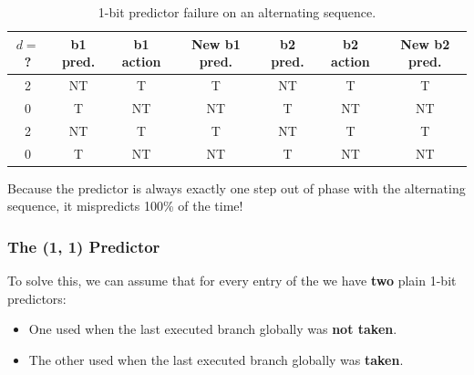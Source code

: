 \begin{table}[htpb]
    \centering
    \renewcommand{\arraystretch}{1.2}
    \begin{tabular}{c c c c | c c c}
        \textbf{\(d=\)?} & \textbf{b1 pred.} & \textbf{b1 action} & \textbf{New b1 pred.} & \textbf{b2 pred.} & \textbf{b2 action} & \textbf{New b2 pred.} \\
        \hline
        2 & NT & T  & T  & NT & T  & T \\
        0 & T  & NT & NT & T  & NT & NT \\
        2 & NT & T  & T  & NT & T  & T \\
        0 & T  & NT & NT & T  & NT & NT \\
        \hline
    \end{tabular}
    \caption{1-bit predictor failure on an alternating sequence.}
    \label{tab:1bit-failure}
\end{table}

Because the predictor is always exactly one step out of phase with the alternating sequence, it mispredicts 100\% of the time!

\subsubsection{The (1, 1) Predictor}
To solve this, we can assume that for every entry of the  we have \textbf{two} plain 1-bit predictors:
\begin{itemize}
    \item One used when the last executed branch globally was \textbf{not taken}.
    \item The other used when the last executed branch globally was \textbf{taken}.
\end{itemize}

